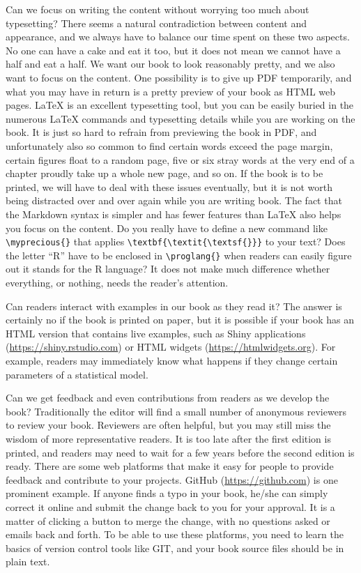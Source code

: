 \documentclass[12pt,]{krantz}
\begin{document}
Can we focus on writing the content without worrying too much about typesetting? There seems a natural contradiction between content and appearance, and we always have to balance our time spent on these two aspects. No one can have a cake and eat it too, but it does not mean we cannot have a half and eat a half. We want our book to look reasonably pretty, and we also want to focus on the content. One possibility is to give up PDF temporarily, and what you may have in return is a pretty preview of your book as HTML web pages. LaTeX is an excellent typesetting tool, but you can be easily buried in the numerous LaTeX commands and typesetting details while you are working on the book. It is just so hard to refrain from previewing the book in PDF, and unfortunately also so common to find certain words exceed the page margin, certain figures float to a random page, five or six stray words at the very end of a chapter proudly take up a whole new page, and so on. If the book is to be printed, we will have to deal with these issues eventually, but it is not worth being distracted over and over again while you are writing book. The fact that the Markdown syntax is simpler and has fewer features than LaTeX also helps you focus on the content. Do you really have to define a new command like \texttt{\textbackslash{}myprecious\{\}} that applies \texttt{\textbackslash{}textbf\{\textbackslash{}textit\{\textbackslash{}textsf\{\}\}\}} to your text? Does the letter ``R'' have to be enclosed in \texttt{\textbackslash{}proglang\{\}} when readers can easily figure out it stands for the R language? It does not make much difference whether everything, or nothing, needs the reader's attention.

Can readers interact with examples in our book as they read it? The answer is certainly no if the book is printed on paper, but it is possible if your book has an HTML version that contains live examples, such as Shiny applications (\url{https://shiny.rstudio.com}) or HTML widgets (\url{https://htmlwidgets.org}). For example, readers may immediately know what happens if they change certain parameters of a statistical model.

Can we get feedback and even contributions from readers as we develop the book? Traditionally the editor will find a small number of anonymous reviewers to review your book. Reviewers are often helpful, but you may still miss the wisdom of more representative readers. It is too late after the first edition is printed, and readers may need to wait for a few years before the second edition is ready. There are some web platforms that make it easy for people to provide feedback and contribute to your projects. GitHub (\url{https://github.com}) is one prominent example. If anyone finds a typo in your book, he/she can simply correct it online and submit the change back to you for your approval. It is a matter of clicking a button to merge the change, with no questions asked or emails back and forth. To be able to use these platforms, you need to learn the basics of version control tools like GIT, and your book source files should be in plain text.
\end{document}
